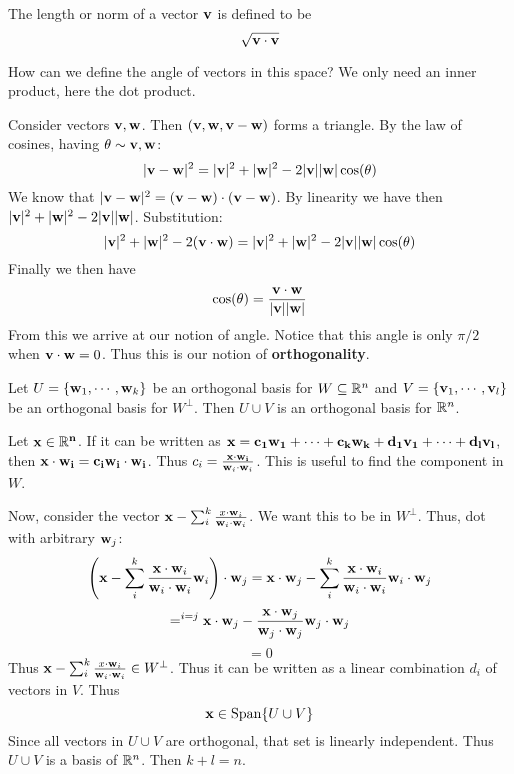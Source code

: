 \documentclass{article}
\begin{document}
    \begin{definition}
        The length or norm of a vector $\mathbf{v}$ is defined to be
        \[\sqrt{\mathbf{v} \cdot \mathbf{v}}\]
    \end{definition}

    \vspace{5em}

    How can we define the angle of vectors in this space? We only need an inner product, here the dot product. \vspace{1em}

    Consider vectors $\mathbf{v}, \mathbf{w}$. Then $(\mathbf{v}, \mathbf{w}, \mathbf{v} - \mathbf{w})$ forms a triangle. By the law of cosines, having $\theta \sim \mathbf{v}, \mathbf{w}$:
    \[|\mathbf{v} - \mathbf{w}|^2 = |\mathbf{v}|^2 + |\mathbf{w}|^2 - 2|\mathbf{v}||\mathbf{w}|\cos(\theta)\]
    We know that $|\mathbf{v} - \mathbf{w}|^2 = (\mathbf{v} - \mathbf{w}) \cdot (\mathbf{v} - \mathbf{w})$. By linearity we have then $|\mathbf{v}|^2 + |\mathbf{w}|^2 - 2|\mathbf{v}||\mathbf{w}|$. Substitution:
    \[|\mathbf{v}|^2 + |\mathbf{w}|^2 - 2(\mathbf{v} \cdot \mathbf{w}) = |\mathbf{v}|^2 + |\mathbf{w}|^2 - 2|\mathbf{v}||\mathbf{w}|\cos(\theta)\]
    Finally we then have 
    \[\cos(\theta) = \frac{\mathbf{v} \cdot \mathbf{w}}{|\mathbf{v}||\mathbf{w}|}\]
    From this we arrive at our notion of angle. Notice that this angle is only $\pi / 2$ when $\mathbf{v} \cdot \mathbf{w} = 0$. Thus this is our notion of \textbf{orthogonality}.

    \begin{proposition}
        Let $U = \{\mathbf{w}_1, \cdots, \mathbf{w}_k\}$ be an orthogonal basis for $W \subseteq \mathbb{R}^n$ and $V = \{\mathbf{v}_1, \cdots, \mathbf{v}_l\}$ be an orthogonal basis for $W^\perp$. Then $U \cup V$ is an orthogonal basis for $\mathbb{R}^n$.
    \end{proposition}

    \pf Let $\bf{x} \in \mathbb{R}^n$. If it can be written as $\bf{x} = c_1\mathbf{w}_1 + \cdots + c_k\mathbf{w}_k + d_1 \mathbf{v}_1 + \cdots + d_l\mathbf{v}_l$, then $\bf{x} \cdot \mathbf{w}_i = c_i \mathbf{w}_i \cdot \mathbf{w}_i$. Thus $c_i = \frac{\bf{x} \cdot \mathbf{w}_i}{\mathbf{w}_i \cdot \mathbf{w}_i}$. This is useful to find the component in $W$. \vspace{1em}

    Now, consider the vector $\mathbf{x} - \sum_i^k \frac{x\cdot \mathbf{w}_i}{\mathbf{w}_i \cdot \mathbf{w}_i}$. We want this to be in $W^\perp$. Thus, dot with arbitrary $\mathbf{w}_j$:
    \[\left(\mathbf{x} - \sum_i^k \frac{\mathbf{x}\cdot \mathbf{w}_i}{\mathbf{w}_i \cdot \mathbf{w}_i} \mathbf{w}_i\right) \cdot \mathbf{w}_j = 
    \mathbf{x} \cdot \mathbf{w}_j - \sum_i^k \frac{\mathbf{x} \cdot \mathbf{w}_i}{\mathbf{w}_i \cdot \mathbf{w}_i}\mathbf{w}_i\cdot \mathbf{w}_j
    \]
    \[=^{i = j} \mathbf{x} \cdot \mathbf{w}_j - \frac{\mathbf{x} \cdot \mathbf{w}_j}{\mathbf{w}_j \cdot \mathbf{w}_j}\mathbf{w}_j \cdot \mathbf{w}_j\]
    \[=0\]
    Thus $\mathbf{x} - \sum_i^k \frac{x\cdot \mathbf{w}_i}{\mathbf{w}_i \cdot \mathbf{w}_i} \in W^\perp$. Thus it can be written as a linear combination $d_i$ of vectors in $V$. Thus
    \[\mathbf{x} \in \text{Span}\{U \cup V\}\]
    Since all vectors in $U \cup V$ are orthogonal, that set is linearly independent. Thus $U \cup V$ is a basis of $\mathbb{R}^n$. Then $k+l = n$. \done
\end{document}
